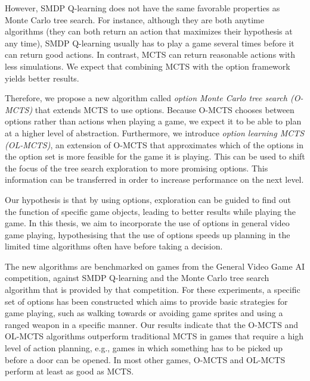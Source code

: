 However, SMDP Q-learning does not have the same favorable properties as Monte Carlo tree
search. For instance, although they are both anytime algorithms (they can both
return an action that maximizes their hypothesis at any time), SMDP Q-learning
usually has to play a game several times before it can return good actions.
In contrast, MCTS can return reasonable actions with less simulations.  We expect
that combining MCTS with the option framework yields better results.

Therefore, we propose a new algorithm called \emph{option Monte Carlo tree
search (O-MCTS)} that extends MCTS to use options. Because O-MCTS chooses
between options rather than actions when playing a game, we expect it to be able
to plan at a higher level of abstraction. Furthermore, we introduce \emph{option
learning MCTS (OL-MCTS)}, an extension of O-MCTS that approximates which of the
options in the option set is more feasible for the game it is playing. This can
be used to shift the focus of the tree search exploration to more promising
options. This information can be transferred in order to increase performance on
the next level.

Our hypothesis is that by using options, exploration can be guided to find out
the function of specific game objects, leading to better results while playing
the game. In this thesis, we aim to incorporate the use of options in general
video game playing, hypothesising that the use of options speeds up planning in
the limited time algorithms often have before taking a decision. 

The new algorithms are benchmarked on games from the General Video Game AI
competition, against SMDP Q-learning and the Monte Carlo tree search algorithm
that is provided by that competition. For these experiments, a specific set of
options has been constructed which aims to provide basic strategies for game
playing, such as walking towards or avoiding game sprites and using a ranged
weapon in a specific manner. Our results indicate that the O-MCTS and OL-MCTS
algorithms outperform traditional MCTS in games that require a high level of
action planning, e.g., games in which something has to be picked up before a
door can be opened. In most other games, O-MCTS and OL-MCTS perform at least as
good as MCTS.

